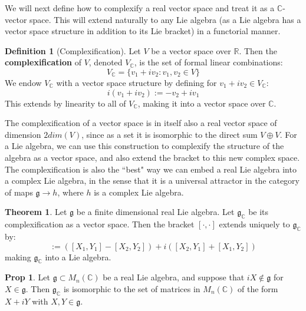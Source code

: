 \documentclass[11pt, oneside]{article}   	%
\theoremstyle{definition}
\newtheorem{definition}{Definition}[section]
\newtheorem{theorem}{Theorem}[section]
\newtheorem{prop}{Prop}[section]
\begin{document}
We will next define how to complexify a real vector space and treat it as a $\mathbb C$-vector space. This 
will extend naturally to any Lie algebra (as a Lie algebra has a vector space structure in addition to its Lie 
bracket) in a functorial manner. 
\begin{definition}[Complexification]
	Let $V$ be a vector space over $\mathbb R$. Then the \textbf{complexification} of $V$, denoted $V_\mathbb{C}$, is the set of 
	formal linear combinations:
	\begin{equation}
		V_\mathbb{C} = \{v_1 + iv_2 : v_1, v_2\in V\}
	\end{equation}
	We endow $V_\mathbb{C}$ with a vector space structure by defining for $v_1 + iv_2\in V_\mathbb{C}$:
	\begin{equation}
		i(v_1 + iv_2) := -v_2 + iv_1
	\end{equation}
	This extends by linearity to all of $V_\mathbb{C}$, making it into a vector space over $\mathbb C$. 
\end{definition}

The complexification of a vector space is in itself also a real vector space of dimension $2dim(V)$, since as a set it is isomorphic to 
the direct sum $V\oplus V$. For a Lie algebra, we can use this construction to complexify the structure of the algebra as a vector space, 
and also extend the bracket to this new complex space. The complexification is also the ``best" way we can embed a real Lie algebra 
into a complex Lie algebra, in the sense that it is a universal attractor in the category of maps $\mathfrak g\rightarrow h$, where 
$h$ is a complex Lie algebra. 

\begin{theorem}
	Let $\mathfrak g$ be a finite dimensional real Lie algebra. Let $\mathfrak g_\mathbb{C}$ be its complexification as a vector 
	space. Then the bracket $[\cdot, \cdot]$ extends uniquely to $\mathfrak g_\mathbb{C}$ by:
	\begin{equation}
		[X_1 + iX_2, Y_1 + iY_2] := ([X_1, Y_1] - [X_2, Y_2]) + i([X_2, Y_1] + [X_1, Y_2])
	\end{equation}
	making $\mathfrak g_\mathbb{C}$ into a Lie algebra. 
\end{theorem}

\begin{prop}
	Let $\mathfrak g\subset M_n(\mathbb C)$ be a real Lie algebra, and suppose that $iX\not\in\mathfrak g$ for $X\in\mathfrak g$. 
	Then $\mathfrak g_\mathbb{C}$ is isomorphic to the set of matrices in $M_n(\mathbb C)$ of the form $X + iY$ with $X, Y\in
	\mathfrak g$. 
\end{prop}
\end{document}
